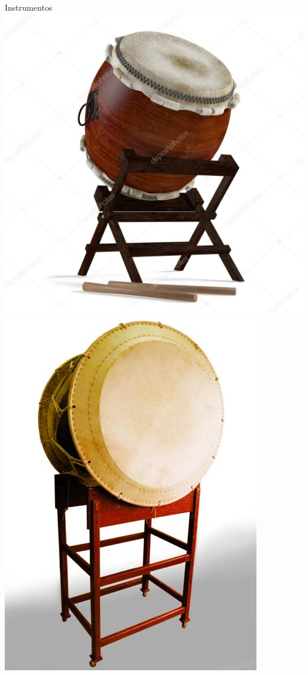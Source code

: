 \documentclass{beamer}
\begin{document}
\begin{frame}{Instrumentos}
    \includegraphics[height=0.2\textheight]{instrumentos-11}
    \includegraphics[height=0.2\textheight]{instrumentos-12}

\end{frame}
\end{document}
